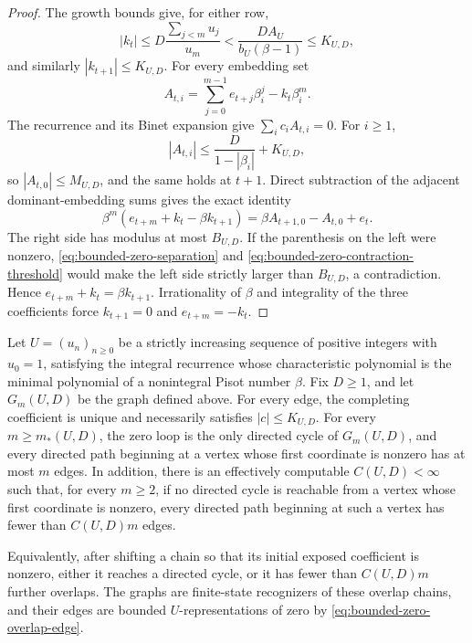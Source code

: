 \begin{proof}
The growth bounds give, for either row,
\[
|k_t|\le D\frac{\sum_{j<m}u_j}{u_m}
 <\frac{DA_U}{b_U(\beta-1)}\le K_{U,D},
\]
and similarly $|k_{t+1}|\le K_{U,D}$.  For every embedding set
\[
A_{t,i}=\sum_{j=0}^{m-1}e_{t+j}\beta_i^j-k_t\beta_i^m.
\]
The recurrence and its Binet expansion give $\sum_i c_iA_{t,i}=0$.
For $i\ge1$,
\[
|A_{t,i}|\le\frac{D}{1-|\beta_i|}+K_{U,D},
\]
so $|A_{t,0}|\le M_{U,D}$, and the same holds at $t+1$.
Direct subtraction of the adjacent dominant-embedding sums gives the exact
identity
\begin{equation}
\beta^m(e_{t+m}+k_t-\beta k_{t+1})
=\beta A_{t+1,0}-A_{t,0}+e_t.
\label{eq:bounded-zero-adjacent-identity}
\end{equation}
The right side has modulus at most $B_{U,D}$.  If the parenthesis on the
left were nonzero, \eqref{eq:bounded-zero-separation} and
\eqref{eq:bounded-zero-contraction-threshold} would make the left side
strictly larger than $B_{U,D}$, a contradiction.  Hence
$e_{t+m}+k_t=\beta k_{t+1}$.  Irrationality of $\beta$ and integrality of
the three coefficients force $k_{t+1}=0$ and $e_{t+m}=-k_t$.
\end{proof}

\begin{theorem}
\label{thm:bounded-zero-linear-transient}
Let $U=(u_n)_{n\ge0}$ be a strictly increasing sequence of positive integers
with $u_0=1$, satisfying the integral recurrence whose characteristic
polynomial is the minimal polynomial of a nonintegral Pisot number $\beta$.
Fix $D\ge1$, and let $G_m(U,D)$ be the graph defined above.  For every edge,
the completing coefficient is unique and necessarily satisfies
$|c|\le K_{U,D}$.
For every $m\ge m_*(U,D)$, the zero loop is the only directed cycle of
$G_m(U,D)$, and every directed path beginning at a vertex whose first
coordinate is nonzero has at most $m$ edges.  In addition, there is an
effectively computable $C(U,D)<\infty$ such that, for every $m\ge2$, if no
directed cycle is reachable from a vertex whose first coordinate is nonzero,
every directed path beginning at such a vertex has fewer than $C(U,D)m$
edges.

Equivalently, after shifting a chain so that its initial exposed coefficient
is nonzero, either it reaches a directed cycle, or it has fewer than
$C(U,D)m$ further overlaps.  The graphs are finite-state recognizers of these
overlap chains, and their edges are bounded $U$-representations of zero by
\eqref{eq:bounded-zero-overlap-edge}.
\end{theorem}

